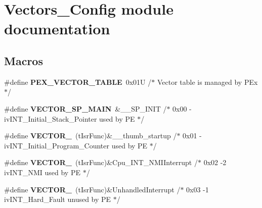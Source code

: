 \hypertarget{group___vectors___config__module}{}\section{Vectors\+\_\+\+Config module documentation}
\label{group___vectors___config__module}
\subsection*{Macros}
\begin{DoxyCompactItemize}
\item 
\#define {\bfseries P\+E\+X\+\_\+\+V\+E\+C\+T\+O\+R\+\_\+\+T\+A\+B\+LE}~0x01\+U     /$\ast$ Vector table is managed by P\+Ex $\ast$/\hypertarget{group___vectors___config__module_ga86ba9b7f3506b4453dde1ccf7a431cd1}{}\label{group___vectors___config__module_ga86ba9b7f3506b4453dde1ccf7a431cd1}

\item 
\#define {\bfseries V\+E\+C\+T\+O\+R\+\_\+\+S\+P\+\_\+\+M\+A\+IN}~\&\+\_\+\+\_\+\+S\+P\+\_\+\+I\+N\+IT                            /$\ast$ 0x00 -\/    iv\+I\+N\+T\+\_\+\+Initial\+\_\+\+Stack\+\_\+\+Pointer    used by P\+E $\ast$/\hypertarget{group___vectors___config__module_ga97d593e7f4ecaa6076a50cc7a5573cc0}{}\label{group___vectors___config__module_ga97d593e7f4ecaa6076a50cc7a5573cc0}

\item 
\#define {\bfseries V\+E\+C\+T\+O\+R\+\_}~(t\+Isr\+Func)\&\+\_\+\+\_\+thumb\+\_\+startup            /$\ast$ 0x01 -\/    iv\+I\+N\+T\+\_\+\+Initial\+\_\+\+Program\+\_\+\+Counter  used by P\+E $\ast$/\hypertarget{group___vectors___config__module_gaed5f21cfee8dfea899c305667499f4f1}{}\label{group___vectors___config__module_gaed5f21cfee8dfea899c305667499f4f1}

\item 
\#define {\bfseries V\+E\+C\+T\+O\+R\+\_}~(t\+Isr\+Func)\&Cpu\+\_\+\+I\+N\+T\+\_\+\+N\+M\+I\+Interrupt       /$\ast$ 0x02 -\/2   iv\+I\+N\+T\+\_\+\+N\+M\+I                      used by P\+E $\ast$/\hypertarget{group___vectors___config__module_gafc92baf1fd2bbd944f247a252af14582}{}\label{group___vectors___config__module_gafc92baf1fd2bbd944f247a252af14582}

\item 
\#define {\bfseries V\+E\+C\+T\+O\+R\+\_}~(t\+Isr\+Func)\&Unhandled\+Interrupt         /$\ast$ 0x03 -\/1   iv\+I\+N\+T\+\_\+\+Hard\+\_\+\+Fault               unused by P\+E $\ast$/\hypertarget{group___vectors___config__module_gab15e9cb9a2707f66fa1c48ee2f78589b}{}\label{group___vectors___config__module_gab15e9cb9a2707f66fa1c48ee2f78589b}


\end{DoxyCompactItemize}
